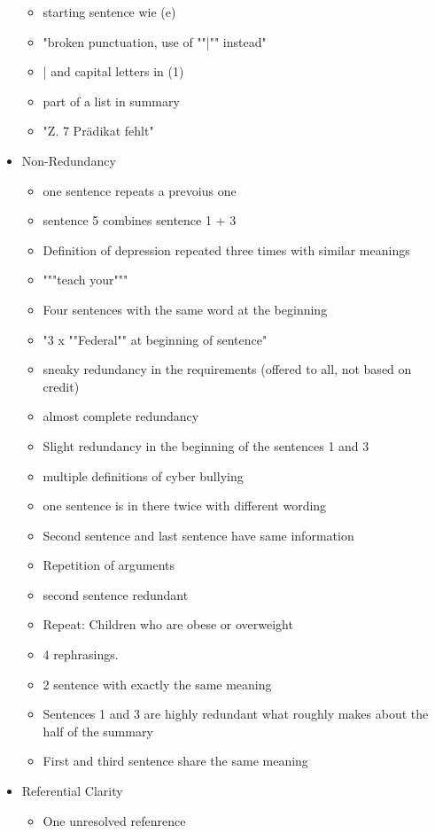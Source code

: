 \begin{itemize}[topsep = 0pt, itemsep = 0pt]
\begin{itemize}[topsep = 0pt, itemsep = 0pt]
		\item starting sentence wie (e)
		\item "broken punctuation, use of ""|"" instead"
		\item | and capital letters in (1)
		\item part of a list in summary
		\item "Z. 7 Prädikat fehlt"
	\end{itemize}
	\item Non-Redundancy
	\begin{itemize}[topsep = 0pt, itemsep = 0pt]
		\item one sentence repeats a prevoius one
		\item sentence 5 combines sentence 1 + 3
		\item Definition of depression repeated three times with similar meanings
		\item """teach your"""
		\item 	Four sentences with the same word at the beginning
		\item "3 x ""Federal"" at beginning of sentence"
		\item 	sneaky redundancy in the requirements (offered to all, not based on credit)
		\item almost complete redundancy
		\item 	Slight redundancy in the beginning of the sentences 1 and 3
		\item multiple definitions of cyber bullying
		\item 	one sentence is in there twice with different wording
		\item Second sentence and last sentence have same information
		\item 	Repetition of arguments
		\item second sentence redundant
		\item 	Repeat: Children who are obese or overweight
		\item 4 rephrasings.
		\item 	2 sentence with exactly the same meaning
		\item Sentences 1 and 3 are highly redundant what roughly makes about the half of the summary
		\item 	First and third sentence share the same meaning
	\end{itemize}
	\item Referential Clarity
	\begin{itemize}[topsep = 0pt, itemsep = 0pt]
		\item One unresolved refenrence

\end{itemize}
\end{itemize}
